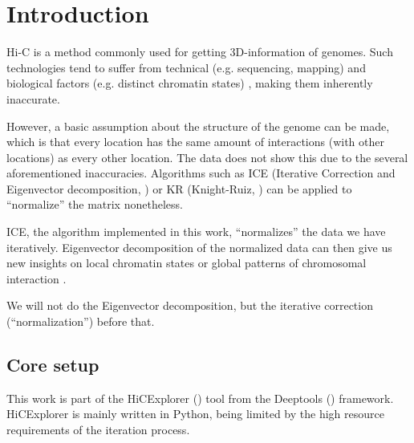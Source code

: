 \chapter{Introduction}\label{chap:introduction}

Hi-C is a method commonly used for getting 3D-information of genomes. Such
technologies tend to suffer from technical (e.g. sequencing, mapping)
\cite{pmid21646344} and biological factors (e.g. distinct chromatin states)
\cite{pmid19693276}, making them inherently inaccurate.

However, a basic assumption about the structure of the genome can be made,
which is that every location has the same amount of interactions (with other
locations) as every other location. The data does not show this due to the
several aforementioned inaccuracies. Algorithms such as ICE (Iterative
Correction and Eigenvector decomposition, ) or KR (Knight-Ruiz,
) can be applied to ``normalize'' the matrix nonetheless.

ICE, the algorithm implemented in this work, ``normalizes'' the data we
have iteratively. Eigenvector decomposition of the normalized data can then
give us new insights on local chromatin states or global patterns of
chromosomal interaction \cite{imakaev2012iterative}.

We will not do the Eigenvector decomposition, but the iterative correction
(``normalization'') before that.


\section{Core setup}\label{sec:setup}

This work is part of the HiCExplorer () tool from the
Deeptools () framework. HiCExplorer is mainly written in
Python, being limited by the high resource requirements of the iteration process.






